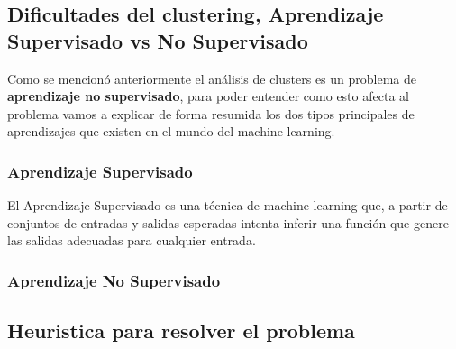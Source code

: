 \documentclass[8pt,a4paper]{article}
\begin{document}
\subsection{Dificultades del clustering, Aprendizaje Supervisado vs No Supervisado}
Como se mencionó anteriormente el análisis de clusters es un problema de \textbf{aprendizaje no supervisado}, para poder entender como esto afecta al problema vamos a explicar de forma resumida los dos tipos principales de aprendizajes que existen en el mundo del machine learning.

\subsubsection*{Aprendizaje Supervisado}
El Aprendizaje Supervisado es una técnica de machine learning que, a partir de conjuntos de entradas y salidas esperadas intenta inferir una función que genere las salidas adecuadas para cualquier entrada.
\subsubsection*{Aprendizaje No Supervisado}



\subsection{Heuristica para resolver el problema}
\end{document}
